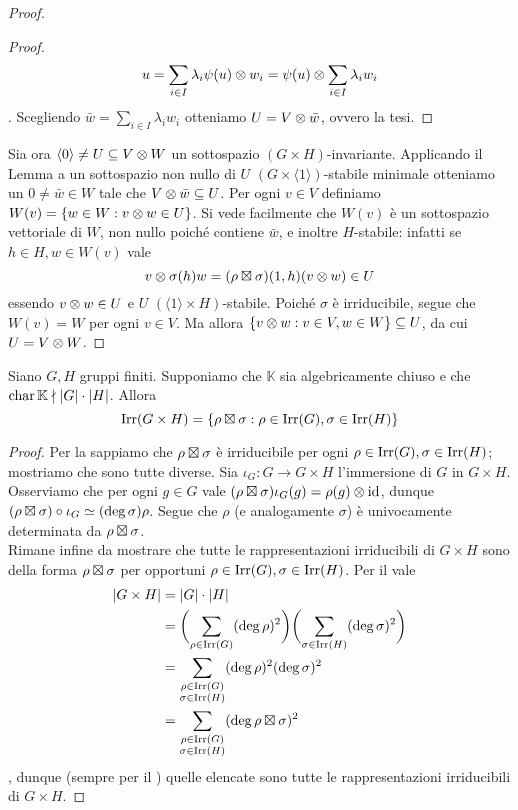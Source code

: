 \begin{proof}
\begin{proof}
$$
u=\sum_{i\in I}\lambda_i\psi(u)\otimes w_i=\psi(u)\otimes\sum_{i\in I}\lambda_i w_i
$$
. Scegliendo $\bar{w}=\sum_{i\in I}\lambda_i w_i$ otteniamo $U=V\otimes\bar{w}$, ovvero la tesi.
\end{proof}
Sia ora $\langle0\rangle\neq U\subseteq V\otimes W$ un sottospazio $(G\times H)$-invariante. Applicando il Lemma a un sottospazio non nullo di $U$ $(G\times\langle1\rangle)$-stabile minimale otteniamo un $0\neq\bar{w}\in W$ tale che $V\otimes\bar{w}\subseteq U$. Per ogni $v\in V$ definiamo $W(v)=\{w\in W:v\otimes w\in U\}$. Si vede facilmente che $W(v)$ è un sottospazio vettoriale di $W$, non nullo poiché contiene $\bar{w}$, e inoltre $H$-stabile: infatti se $h\in H\comma w\in W(v)$ vale
$$
v\otimes\sigma(h)w=(\rho\boxtimes\sigma)(1,h)(v\otimes w)\in U
$$
essendo $v\otimes w\in U$ e $U$ $(\langle1\rangle\times H)$-stabile. Poiché $\sigma$ è irriducibile, segue che $W(v)=W$ per ogni $v\in V$. Ma allora $\{v\otimes w:v\in V,w\in W\}\subseteq U$, da cui $U=V\otimes W$.
\end{proof}

\begin{corollary}
Siano $G\comma H$ gruppi finiti. Supponiamo che $\mathbb{K}$ sia algebricamente chiuso e che $\operatorname{char}\mathbb{K}\nmid|G|\cdot|H|$. Allora
$$
\operatorname{Irr}(G\times H)=\{\rho\boxtimes\sigma:\rho\in\operatorname{Irr}(G),\sigma\in\operatorname{Irr}(H)\}
$$
\end{corollary}
\begin{proof}
Per la  sappiamo che $\rho\boxtimes\sigma$ è irriducibile per ogni $\rho\in\operatorname{Irr}(G),\allowbreak\sigma\in\operatorname{Irr}(H)$; mostriamo che sono tutte diverse. Sia $\iota_G:G\to G\times H$ l'immersione di $G$ in $G\times H$. Osserviamo che per ogni $g\in G$ vale $(\rho\boxtimes\sigma)\iota_G(g)=\rho(g)\otimes\operatorname{id}$, dunque $(\rho\boxtimes\sigma)\circ\iota_G\simeq(\deg\sigma)\rho$. Segue che $\rho$ (e analogamente $\sigma$) è univocamente determinata da $\rho\boxtimes\sigma$.\\
Rimane infine da mostrare che tutte le rappresentazioni irriducibili di $G\times H$ sono della forma $\rho\boxtimes\sigma$ per opportuni $\rho\in\operatorname{Irr}(G),\allowbreak\sigma\in\operatorname{Irr}(H)$. Per il  vale
\begin{align*}
|G\times H|&=|G|\cdot|H|\\
&=\biggl(\sum_{\rho\in\operatorname{Irr}(G)}(\deg\rho)^2\biggr)\biggl(\sum_{\sigma\in\operatorname{Irr}(H)}(\deg\sigma)^2\biggr)\\
&=\sum_{\substack{\rho\in\operatorname{Irr}(G)\\\sigma\in\operatorname{Irr}(H)}}(\deg\rho)^2(\deg\sigma)^2\\
&=\sum_{\substack{\rho\in\operatorname{Irr}(G)\\\sigma\in\operatorname{Irr}(H)}}(\deg\rho\boxtimes\sigma)^2
\end{align*}
, dunque (sempre per il ) quelle elencate sono tutte le rappresentazioni irriducibili di $G\times H$.
\end{proof}

